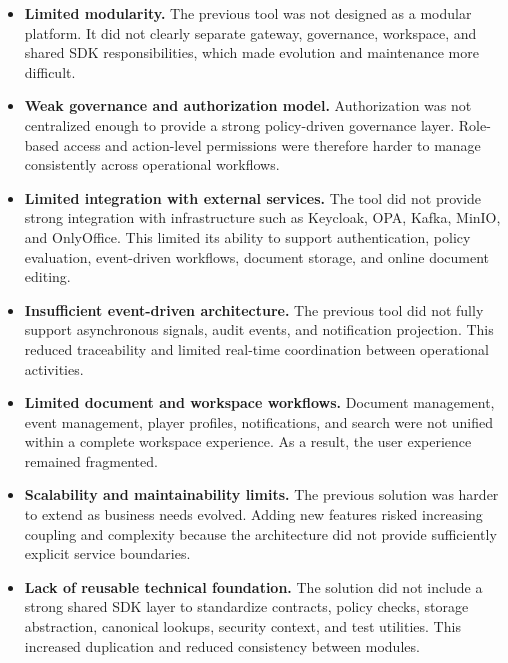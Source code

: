\begin{itemize}
    \item \textbf{Limited modularity.} The previous tool was not designed as a
    modular platform. It did not clearly separate gateway, governance,
    workspace, and shared SDK responsibilities, which made evolution and
    maintenance more difficult.

    \item \textbf{Weak governance and authorization model.} Authorization was
    not centralized enough to provide a strong policy-driven governance layer.
    Role-based access and action-level permissions were therefore harder to
    manage consistently across operational workflows.

    \item \textbf{Limited integration with external services.} The tool did
    not provide strong integration with infrastructure such as Keycloak, OPA,
    Kafka, MinIO, and OnlyOffice. This limited its ability to support
    authentication, policy evaluation, event-driven workflows, document
    storage, and online document editing.

    \item \textbf{Insufficient event-driven architecture.} The previous tool
    did not fully support asynchronous signals, audit events, and notification
    projection. This reduced traceability and limited real-time coordination
    between operational activities.

    \item \textbf{Limited document and workspace workflows.} Document
    management, event management, player profiles, notifications, and search
    were not unified within a complete workspace experience. As a result, the
    user experience remained fragmented.

    \item \textbf{Scalability and maintainability limits.} The previous
    solution was harder to extend as business needs evolved. Adding new
    features risked increasing coupling and complexity because the
    architecture did not provide sufficiently explicit service boundaries.

    \item \textbf{Lack of reusable technical foundation.} The solution did not
    include a strong shared SDK layer to standardize contracts, policy checks,
    storage abstraction, canonical lookups, security context, and test
    utilities. This increased duplication and reduced consistency between
    modules.
\end{itemize}

